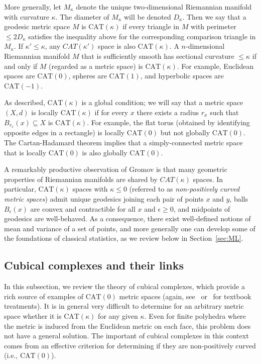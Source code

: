 \documentclass[a4paper,11pt]{article}
\newcommand{\CAT}{\textrm{CAT}}
\begin{document}
More generally, let $M_{\kappa}$ denote the unique two-dimensional Riemannian manifold with curvature $\kappa$.
The diameter of $M_{\kappa}$ will be denoted $D_{\kappa}$.
Then we say that a geodesic metric space $M$ is $\CAT(\kappa)$ if every triangle in $M$ with perimeter $\leq 2D_{\kappa}$ satisfies the inequality above for the corresponding comparison triangle in $M_{\kappa}$.
If $\kappa' \leq \kappa$, any $CAT(\kappa')$ space is also $\CAT(\kappa)$.
A $n$-dimensional Riemannian manifold $M$ that is sufficiently smooth has sectional curvature $\leq \kappa$ if and only if $M$ (regarded as a metric space) is $\CAT(\kappa)$.
For example, Euclidean spaces are $\CAT(0)$, spheres are $\CAT(1)$, and hyperbolic spaces are $\CAT(-1)$.

As described, $\CAT(\kappa)$ is a global condition; we will say that a metric space $(X,d)$ is locally $\CAT(\kappa)$ if for every $x$ there exists a radius $r_x$ such that $B_{r_x}(x) \subseteq X$ is $\CAT(\kappa)$.
For example, the flat torus (obtained by identifying opposite edges in a rectangle) is locally $\CAT(0)$ but not globally $\CAT(0)$.
The Cartan-Hadamard theorem implies that a simply-connected metric space that is locally $\CAT(0)$ is also globally $\CAT(0)$.

A remarkably productive observation of Gromov is that many geometric properties of Riemannian manifolds are shared by $CAT(\kappa)$ spaces.
In particular, $\CAT(\kappa)$ spaces with $\kappa \leq 0$ (referred to as {\em non-positively curved metric spaces}) admit unique geodesics joining each pair of points $x$ and $y$, balls $B_{\epsilon}(x)$ are convex and contractible for all $x$ and $\epsilon \geq 0$, and midpoints of geodesics are well-behaved.
As a consequence, there exist well-defined notions of mean and variance of a set of points, and more generally one can develop some of the foundations of classical statistics, as we review below in Section~\ref{sec:ML}.

\subsection{Cubical complexes and their links}

In this subsection, we review the theory of cubical complexes, which provide a rich source of examples of $\CAT(0)$ metric spaces (again, see~\cite{burago01} or~\cite{bridson99} for textbook treatments).
It is in general very difficult to determine for an arbitrary metric space whether it is $\CAT(\kappa)$ for any given $\kappa$.
Even for finite polyhedra where the metric is induced from the Euclidean metric on each face, this problem does not have a general solution.
The important of cubical complexes in this context comes from an effective criterion for determining if they are non-positively curved (i.e., $\CAT(0)$).
\end{document}

